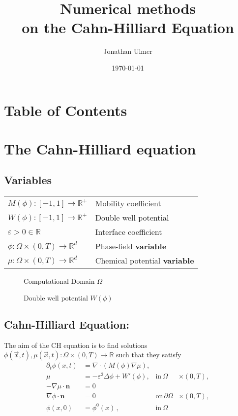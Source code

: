 \documentclass[11pt]{article}
\author{Jonathan Ulmer}
\date{\today}
\title{Numerical methods\\\medskip
\large on the Cahn-Hilliard Equation}
\begin{document}
\maketitle
\section*{Table of Contents}
\label{sec:org8a33c53}
\section*{The Cahn-Hilliard equation}
\label{sec:org0cb516e}
\subsection*{Variables}
\label{sec:org4f9ea90}
\begin{center}
\begin{tabular}{ll}
\(M(\phi): [-1,1] \to \mathbb{R}^+\) & Mobility coefficient\\
\(W(\phi): [-1,1] \to \mathbb{R}^+\) & Double well potential\\
\(\varepsilon > 0 \in \mathbb{R}\) & Interface coefficient\\
\(\phi : \Omega \times (0,T) \to \mathbb{R}^d\) & Phase-field \textbf{variable}\\
\(\mu : \Omega \times (0,T) \to \mathbb{R}^d\) & Chemical potential \textbf{variable}\\
\end{tabular}
\end{center}
\begin{figure}[htbp]
\centering

\caption{\label{fig:domain}Computational Domain \(\Omega\)}
\end{figure}
\begin{figure}[htbp]
\centering

\caption{\label{fig:double-well}Double well potential \(W(\phi)\)}
\end{figure}
\subsection*{Cahn-Hilliard Equation:}
\label{sec:org1046473}
The aim of the CH equation is to find solutions \(\phi(\vec{x} , t) , \mu(\vec{x} , t): \Omega \times (0,T) \to \mathbb{R}\) such that they satisfy
\begin{equation}
\label{eq:initial-value-problem}
\begin{aligned}
\partial_{t}\phi(x,t) &=  \nabla \cdot(M(\phi)\nabla\mu),\\
\mu &= - \varepsilon^2 \Delta\phi  + W'(\phi), & \text{in} \, \Omega &\times (0,T),\\
-\nabla\mu \cdot \mathbf{n} &= 0\\
\nabla\phi \cdot \mathbf{n} &= 0 & \text{on} \, \partial\Omega &\times (0,T), \\
\phi(x,0) &= \phi^0(x) \,, & \text{in} \, \Omega &
\end{aligned}
\end{equation}
\end{document}
